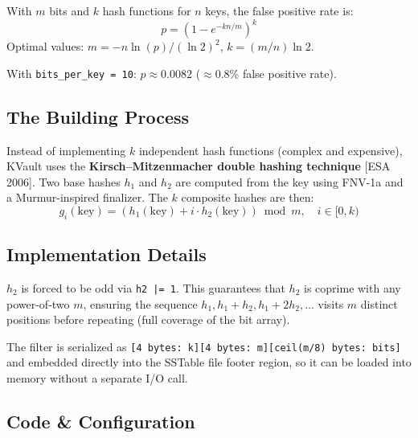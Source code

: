 \documentclass[11pt,a4paper]{article}
\begin{document}
With $m$ bits and $k$ hash functions for $n$ keys, the false positive rate is:
\[ p = \left(1 - e^{-kn/m}\right)^k \]
Optimal values: $m = -n \ln(p) / (\ln 2)^2$, $k = (m/n) \ln 2$.

With \texttt{bits\_per\_key = 10}: $p \approx 0.0082$ ($\approx 0.8\%$ false positive rate).

\subsection{The Building Process}

Instead of implementing $k$ independent hash functions (complex and expensive),
KVault uses the \textbf{Kirsch--Mitzenmacher double hashing technique} [ESA 2006].
Two base hashes $h_1$ and $h_2$ are computed from the key using FNV-1a and a
Murmur-inspired finalizer. The $k$ composite hashes are then:
\[g_i(\text{key}) = (h_1(\text{key}) + i \cdot h_2(\text{key})) \bmod m, \quad i \in [0, k)\]

\subsection{Implementation Details}

$h_2$ is forced to be odd via \texttt{h2 |= 1}. This guarantees that
$h_2$ is coprime with any power-of-two $m$, ensuring the sequence
$h_1, h_1+h_2, h_1+2h_2, \ldots$ visits $m$ distinct positions before
repeating (full coverage of the bit array).

The filter is serialized as \texttt{[4 bytes: k][4 bytes: m][ceil(m/8) bytes: bits]}
and embedded directly into the SSTable file footer region, so it can be loaded
into memory without a separate I/O call.

\subsection{Code \& Configuration}
\end{document}
